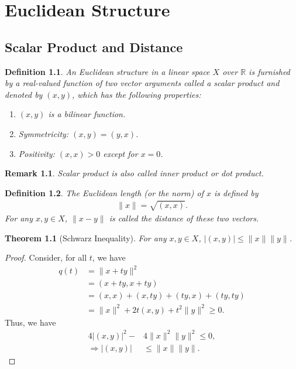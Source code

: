 \documentclass[10pt]{book}
\newtheorem{definition}{Definition}[chapter]
\newtheorem{theorem}{Theorem}[chapter]
\newtheorem{remark}{Remark}[chapter]
\theoremstyle{definition}
\numberwithin{equation}{chapter}
\begin{document}
\medskip

\chapter{Euclidean Structure}\label{chapter_7}
\section{Scalar Product and Distance}
\begin{definition}
An Euclidean structure in a linear space $X$ over $\mathbb{R}$ is furnished by a real-valued function of two vector arguments called a scalar product and denoted by $(x,y)$, which has the following properties:
\begin{enumerate}[label=(\arabic*)]
    \item $(x,y)$ is a bilinear function.
    \item Symmetricity: $(x,y) = (y,x)$.
    \item Positivity: $(x,x) > 0$ except for $x = 0$. 
\end{enumerate}
\end{definition}
\begin{remark}
Scalar product is also called inner product or dot product.
\end{remark}

\medskip

\begin{definition}
The Euclidean length (or the norm) of $x$ is defined by 
\begin{align*}
    \|x\| = \sqrt{(x,x)}.
\end{align*}
For any $x,y\in X$, $\|x- y\|$ is called the distance of these two vectors.
\end{definition}

\medskip

\begin{theorem}[Schwarz Inequality]
For any $x,y\in X$, $\left|(x,y)\right| \leq \|x\| \|y\|$.
\end{theorem}
\begin{proof}
Consider, for all $t$, we have
\begin{align*}
    q(t) & = \|x+ty\|^2 \\
    & = (x+ty,x+ty) \\
    & = (x,x) + (x,ty) + (ty,x) + (ty,ty) \\
    & = \|x\|^2 + 2t (x,y) + t^2 \|y\|^2  \geq 0.
\end{align*}
Thus, we have 
\begin{align*}
    4\left|(x,y)\right|^2 - & 4 \|x\|^2 \|y\|^2 \leq 0, \\
    \Rightarrow \left|(x,y)\right| & \leq \|x\| \|y\|.
\end{align*}
\end{proof}
\end{document}
